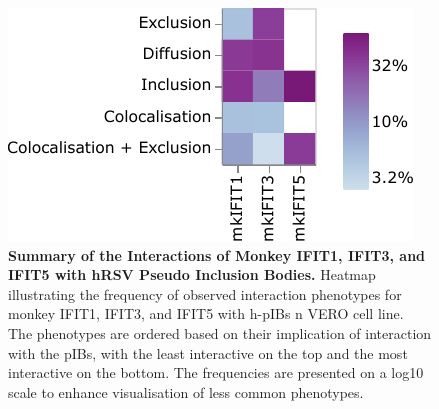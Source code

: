 \begin{figure}
    \centering
    \includegraphics[width=0.6\linewidth]{09. Chapter 4/Figs/heatmap-vero-hnhp-i135.pdf}
    \caption[Summary of the Interactions of Monkey IFIT1, IFIT3, and IFIT5 with hRSV Pseudo Inclusion Bodies.]{\textbf{Summary of the Interactions of Monkey IFIT1, IFIT3, and IFIT5 with hRSV Pseudo Inclusion Bodies.} Heatmap illustrating the frequency of observed interaction phenotypes for monkey IFIT1, IFIT3, and IFIT5 with h-pIBs n VERO cell line. The phenotypes are ordered based on their implication of interaction with the pIBs, with the least interactive on the top and the most interactive on the bottom. The frequencies are presented on a log10 scale to enhance visualisation of less common phenotypes.}
    \label{fig:Summary of the Interactions of Monkey IFIT1, IFIT3, and IFIT5 with hRSV Pseudo Inclusion Bodies}
\end{figure}


